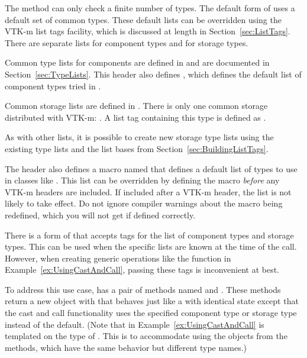 The  method can only check a finite number of types.
The default form of  uses a default set of common
types. These default lists can be overridden using the VTK-m list tags
facility, which is discussed at length in Section~\ref{sec:ListTags}. There
are separate lists for component types and for storage types.

Common type lists for components are defined in
 and are documented in
Section~\ref{sec:TypeLists}. This header also defines
, which defines the default list
of component types tried in .


Common storage lists are defined in
. There is only one common storage
distributed with VTK-m: . A list tag
containing this type is defined as .

As with other lists, it is possible to create new storage type lists
using the existing type lists and the list bases from
Section~\ref{sec:BuildingListTags}.

The  header also defines a macro
named  that defines a
default list of types to use in classes like
. This list can be overridden by
defining the  macro
\emph{before} any VTK-m headers are included. If included after a VTK-m
header, the list is not likely to take effect. Do not ignore compiler
warnings about the macro being redefined, which you will not get if defined
correctly.


There is a form of  that accepts tags for the list of
component types and storage types. This can be used when the specific
lists are known at the time of the call. However, when creating generic
operations like the  function in
Example~\ref{ex:UsingCastAndCall}, passing these tags is inconvenient at
best.

To address this use case,  has a pair of
methods named  and
. These methods return a new object with that
behaves just like a  with identical
state except that the cast and call functionality uses the specified
component type or storage type instead of the default. (Note that
 in Example~\ref{ex:UsingCastAndCall} is
templated on the type of . This is to
accommodate using the objects from the  methods, which
have the same behavior but different type names.)

